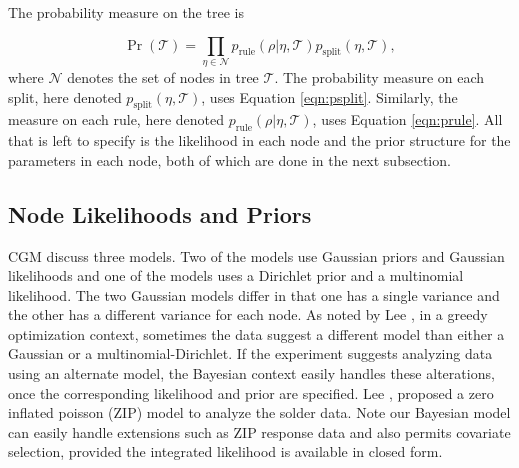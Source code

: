  The probability measure on the tree is  
 
 \begin{equation}
 \Pr(\mathcal{T}) = \prod_{\eta \in \mathcal{N}} p_{\text{rule}}(\rho \vert \eta, \mathcal{T})p_{\text{split}}(\eta, \mathcal{T}),
\end{equation}
where $\mathcal{N}$ denotes the set of nodes in tree $\mathcal{T}$.
The probability measure on each split, here denoted $p_{\text{split}}(\eta, \mathcal{T})$, uses Equation \ref{eqn:psplit}. Similarly, the measure on each rule, here denoted $p_{\text{rule}}(\rho \vert \eta, \mathcal{T})$, uses Equation \ref{eqn:prule}. 
All that is left to specify is the likelihood in each node and the prior structure for the parameters in each node, both of which are done in the next subsection. 

\subsection{Node Likelihoods and Priors}

CGM discuss three models. Two of the models use Gaussian priors and Gaussian likelihoods and one of the models uses a Dirichlet prior and a multinomial likelihood. The two Gaussian models differ in that one has a single variance and the other has a different variance for each node. As noted by Lee \cite{lee2006decision}, in a greedy optimization context, sometimes the data suggest a different model than either a Gaussian or a multinomial-Dirichlet. If the experiment suggests analyzing data using an alternate model, the Bayesian context easily handles these alterations, once the corresponding likelihood and prior are specified. Lee \cite{lee2006decision}, proposed a zero inflated poisson (ZIP) model to analyze the solder data. Note our Bayesian model can easily handle extensions such as ZIP response data and also permits covariate selection, provided the integrated likelihood is available in closed form.

